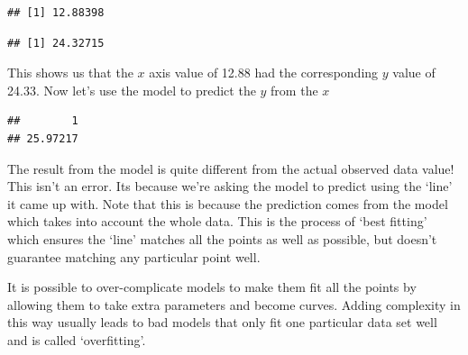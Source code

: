\documentclass[
]{book}
\newenvironment{Shaded}{\begin{snugshade}}{\end{snugshade}}
\newcommand{\AttributeTok}[1]{\textcolor[rgb]{0.77,0.63,0.00}{#1}}
\newcommand{\DecValTok}[1]{\textcolor[rgb]{0.00,0.00,0.81}{#1}}
\newcommand{\FunctionTok}[1]{\textcolor[rgb]{0.00,0.00,0.00}{#1}}
\newcommand{\NormalTok}[1]{#1}
\newcommand{\OtherTok}[1]{\textcolor[rgb]{0.56,0.35,0.01}{#1}}
\newcommand{\SpecialCharTok}[1]{\textcolor[rgb]{0.00,0.00,0.00}{#1}}
\newenvironment{sidenote}
{ \begin{tcolorbox}[colbacktitle=blue!50!white,
title=huh?,coltitle=white,
fonttitle=\bfseries] }
{  \end{tcolorbox} }
\begin{document}
\begin{Shaded}
\end{Shaded}

\begin{verbatim}
## [1] 12.88398
\end{verbatim}

\begin{Shaded}
\end{Shaded}

\begin{verbatim}
## [1] 24.32715
\end{verbatim}

This shows us that the \(x\) axis value of 12.88 had the corresponding \(y\) value of 24.33. Now let's use the model to predict the \(y\) from the \(x\)

\begin{Shaded}
\end{Shaded}

\begin{verbatim}
##        1 
## 25.97217
\end{verbatim}

The result from the model is quite different from the actual observed data value! This isn't an error. Its because we're asking the model to predict using the `line' it came up with. Note that this is because the prediction comes from the model which takes into account the whole data. This is the process of `best fitting' which ensures the `line' matches all the points as well as possible, but doesn't guarantee matching any particular point well.

\begin{sidenote}
It is possible to over-complicate models to make them fit all the points by allowing them to take extra parameters and become curves. Adding complexity in this way usually leads to bad models that only fit one particular data set well and is called `overfitting'.
\end{sidenote}
\end{document}

